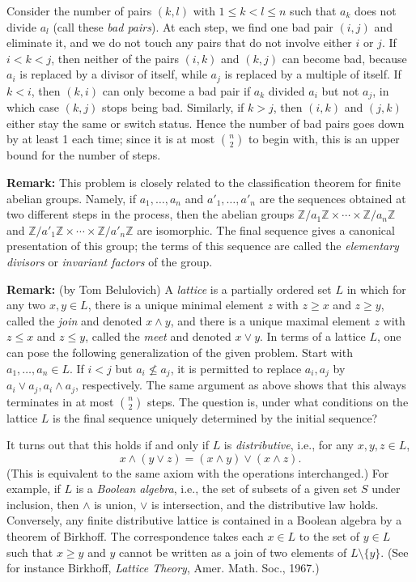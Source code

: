 \documentclass[amssymb,twocolumn,pra,10pt,aps]{revtex4-1}
\newcommand{\ZZ}{\mathbb{Z}}
\begin{document}
\begin{itemize}
Consider the number of pairs $(k,l)$
with $1 \leq k < l \leq n$ such that $a_k$ does not divide $a_l$
(call these \emph{bad pairs}).
At each step, we find one bad pair $(i,j)$ and eliminate it, and we do not
touch any pairs that do not involve either $i$ or $j$.
If $i < k < j$, then neither of the pairs $(i,k)$ and $(k,j)$ can become
bad,
because $a_i$ is replaced by a divisor of itself, while $a_j$ is replaced by
a multiple of itself. If $k < i$, then $(k,i)$ can only become a bad pair if
$a_k$ divided $a_i$ but not $a_j$, in which case $(k,j)$ stops being bad.
Similarly, if $k > j$, then $(i,k)$ and $(j,k)$
either stay the same or switch status. Hence the number of bad pairs
goes down by at least 1 each time; since it is at most $\binom{n}{2}$
to begin with, this is an upper bound for the number of steps.

\textbf{Remark:}
This problem is closely related to the classification theorem for
finite abelian groups. Namely, if $a_1,\dots,a_n$
and $a'_1,\dots,a'_n$ are the sequences obtained at two different
steps in the process, then the abelian groups
$\ZZ/a_1 \ZZ \times \cdots \times \ZZ/a_n \ZZ$
and
$\ZZ/a'_1 \ZZ \times \cdots \times \ZZ/a'_n \ZZ$
are isomorphic. The final sequence gives a canonical
presentation of this group; the terms of this sequence are called the
\emph{elementary divisors} or \emph{invariant factors} of the group.

\textbf{Remark:} (by Tom Belulovich)
A \emph{lattice} is a partially ordered set $L$ in which for
any two $x,y \in L$, there is a unique minimal element $z$ with $z \geq
x$ and $z \geq y$, called the \emph{join} and denoted $x \wedge y$,
and there is a unique maximal element $z$ with $z \leq x$ and $z \leq y$,
called the \emph{meet} and denoted $x \vee y$. In terms of a lattice $L$,
one can pose the following generalization of the given problem.
Start with $a_1,\dots,a_n \in L$. If $i < j$ but $a_i \not\leq a_j$,
it is permitted to replace $a_i, a_j$ by $a_i \vee a_j, a_i \wedge a_j$,
respectively. The same argument as above shows that this always terminates
in at most $\binom{n}{2}$ steps. The question is, under what conditions on
the lattice $L$ is the final sequence uniquely determined by the initial
sequence?

It turns out that this holds if and only if $L$ is \emph{distributive},
i.e., for any $x,y,z \in L$,
\[
x \wedge (y \vee z)
= (x \wedge y) \vee (x \wedge z).
\]
(This is equivalent to the same axiom with the operations interchanged.)
For example, if $L$ is a \emph{Boolean algebra}, i.e., the set of subsets
of a given set $S$ under inclusion, then $\wedge$ is union, $\vee$
is intersection, and the distributive law holds.
Conversely, any finite
distributive lattice is contained in a Boolean algebra by a theorem of
Birkhoff. The correspondence takes each  $x \in L$ to the set of
$y \in L$ such that $x \geq y$ and $y$ cannot be written as a join
of two elements of $L \setminus \{y\}$. (See for instance
Birkhoff, \textit{Lattice Theory}, Amer. Math. Soc., 1967.)


\end{itemize}
\end{document}
